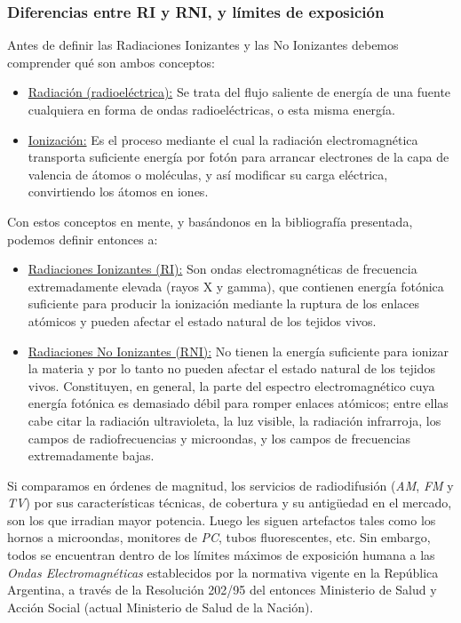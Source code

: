 \documentclass[12pt]{article}
\begin{document}
\subsubsection{Diferencias entre RI y RNI, y límites de exposición}
\label{sec_2.4.2}
Antes de definir las Radiaciones Ionizantes y las No Ionizantes debemos comprender qué son ambos conceptos:
\begin{itemize}
    \item \underline{Radiación (radioeléctrica):} Se trata del flujo saliente de energía de una fuente cualquiera en forma de ondas radioeléctricas, o esta misma energía. \cite[p. 14]{b1}
    \item \underline{Ionización:} Es el proceso mediante el cual la radiación electromagnética transporta suficiente energía por fotón para arrancar electrones de la capa de valencia de átomos o moléculas, y así modificar su carga eléctrica, convirtiendo los átomos en iones. \cite[p. 45]{b1}
\end{itemize}

Con estos conceptos en mente, y basándonos en la bibliografía presentada, podemos definir entonces a:
\begin{itemize}
    \item \underline{Radiaciones Ionizantes (RI):} Son ondas electromagnéticas de frecuencia extremadamente elevada (rayos X y gamma), que contienen energía fotónica suficiente para producir la ionización mediante la ruptura de los enlaces atómicos y pueden afectar el estado natural de los tejidos vivos. \cite[p. 45]{b1}

    \item \underline{Radiaciones No Ionizantes (RNI):} No tienen la energía suficiente para ionizar la materia y por lo tanto no pueden afectar el estado natural de los tejidos vivos. Constituyen, en general, la parte del espectro electromagnético cuya energía fotónica es demasiado débil para romper enlaces atómicos; entre ellas cabe citar la radiación ultravioleta, la luz visible, la radiación infrarroja, los campos de radiofrecuencias y microondas, y los campos de frecuencias extremadamente bajas. \cite[p. 45]{b1}
\end{itemize}

Si comparamos en órdenes de magnitud, los servicios de radiodifusión (\textit{AM}, \textit{FM} y \textit{TV}) por sus características técnicas, de cobertura y su antigüedad en el mercado, son los que irradian mayor potencia. Luego les siguen artefactos tales como los hornos a microondas, monitores de \textit{PC}, tubos fluorescentes, etc. Sin embargo, todos se encuentran dentro de los límites máximos de exposición humana a las \textit{Ondas Electromagnéticas} establecidos por la normativa vigente en la República Argentina, a través de la Resolución 202/95 del entonces Ministerio de Salud y Acción Social (actual Ministerio de Salud de la Nación). 
\end{document}
